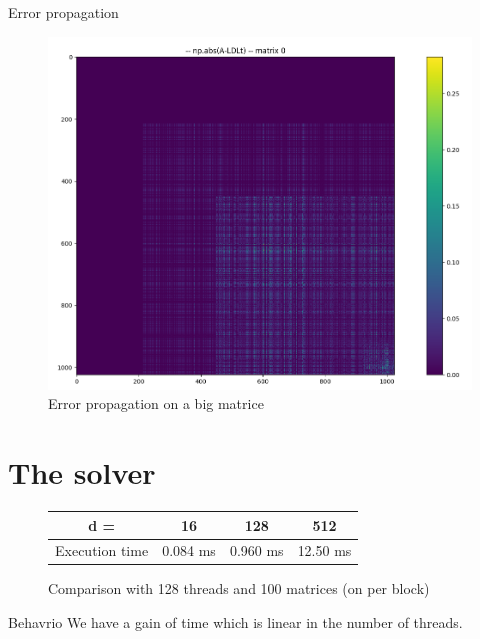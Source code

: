 \documentclass[compress,xcolor=table]{beamer}
\begin{document}
\begin{frame}{Error propagation}
	\begin{figure}
		\centering
		\includegraphics[scale=0.3]{images/bigerrors.png}
		\caption{Error propagation on a big matrice}
	\end{figure}
\end{frame}

\section{The solver}

\begin{frame}{}
	
	\begin{figure}
		\begin{tabular}{c|c|c|c}
			d = & 16 & 128 & 512  
			\\
			\hline
			Execution time &  0.084 ms & 0.960 ms &  12.50 ms \\
		\end{tabular}
		
		\caption{Comparison with 128 threads and 100 matrices (on per block)}
	\end{figure}
	
\end{frame}

\begin{frame}{}
	
\begin{block}{Behavrio}
	We have a gain of time which is linear in the number of threads.
\end{block}
	
\end{frame}
\end{document}
